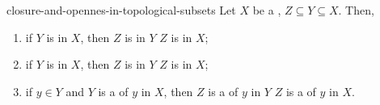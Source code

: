 \documentclass[preview]{standalone}
\begin{document}
\begin{snippetlemma}{closure-and-opennes-in-topological-subsets}{}
    Let \(X\) be a \topologicalspace, \(Z \subseteq Y \subseteq X\). Then,
    \begin{enumerate}
        \item if \(Y\) is \openset[open][Open] in \(X\),
        then \(Z\) is \openset[open][Open] in \(Y\)
        \ifandonlyif \(Z\) is \openset[open][Open] in \(X\);
        \item if \(Y\) is \closedset[closed] in \(X\),
        then \(Z\) is \closedset[closed] in \(Y\)
        \ifandonlyif \(Z\) is \closedset[closed] in \(X\);
        \item if \(y\in Y\) and \(Y\) is a \neighborhood of \(y\) in \(X\),
        then \(Z\) is a \neighborhood of \(y\) in \(Y\) \ifandonlyif \(Z\)
        is a \neighborhood of \(y\) in \(X\).
    \end{enumerate}
\end{snippetlemma}
\end{document}
